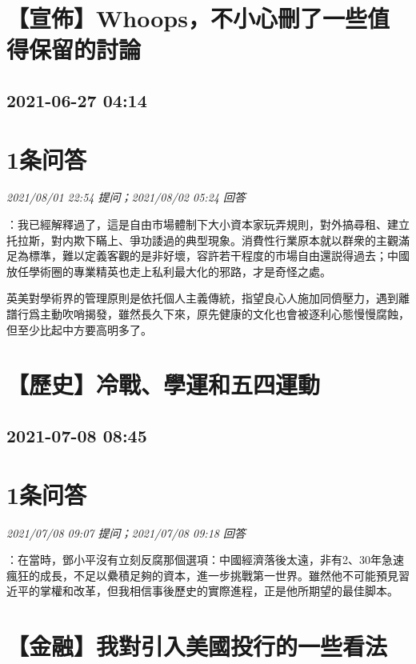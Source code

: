 \documentclass[twocolumn]{ctexart}
\begin{document}
\section{【宣佈】Whoops，不小心刪了一些值得保留的討論}
\subsection{2021-06-27 04:14}


\section{1条问答}

\textit{\hfill\noindent\small 2021/08/01 22:54 提问；2021/08/02 05:24 回答}

：我已經解釋過了，這是自由市場體制下大小資本家玩弄規則，對外搞尋租、建立托拉斯，對内欺下瞞上、爭功諉過的典型現象。消費性行業原本就以群衆的主觀滿足為標準，難以定義客觀的是非好壞，容許若干程度的市場自由還説得過去；中國放任學術圈的專業精英也走上私利最大化的邪路，才是奇怪之處。

英美對學術界的管理原則是依托個人主義傳統，指望良心人施加同儕壓力，遇到離譜行爲主動吹哨揭發，雖然長久下來，原先健康的文化也會被逐利心態慢慢腐蝕，但至少比起中方要高明多了。
\\


\section{【歷史】冷戰、學運和五四運動}
\subsection{2021-07-08 08:45}


\section{1条问答}

\textit{\hfill\noindent\small 2021/07/08 09:07 提问；2021/07/08 09:18 回答}

：在當時，鄧小平沒有立刻反腐那個選項：中國經濟落後太遠，非有2、30年急速瘋狂的成長，不足以纍積足夠的資本，進一步挑戰第一世界。雖然他不可能預見習近平的掌權和改革，但我相信事後歷史的實際進程，正是他所期望的最佳脚本。
\\


\section{【金融】我對引入美國投行的一些看法}
\end{document}
